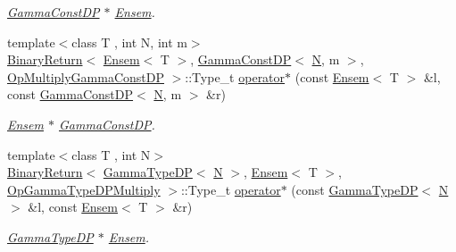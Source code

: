 \begin{DoxyCompactItemize}
\begin{DoxyCompactList}\small\item\em \mbox{\hyperlink{classENSEM_1_1GammaConstDP}{Gamma\+Const\+DP}} $\ast$ \mbox{\hyperlink{classENSEM_1_1Ensem}{Ensem}}. \end{DoxyCompactList}\item 
{\footnotesize template$<$class T , int N, int m$>$ }\\\mbox{\hyperlink{structENSEM_1_1BinaryReturn}{Binary\+Return}}$<$ \mbox{\hyperlink{classENSEM_1_1Ensem}{Ensem}}$<$ T $>$, \mbox{\hyperlink{classENSEM_1_1GammaConstDP}{Gamma\+Const\+DP}}$<$ \mbox{\hyperlink{operator__name__util_8cc_a7722c8ecbb62d99aee7ce68b1752f337}{N}}, m $>$, \mbox{\hyperlink{structENSEM_1_1OpMultiplyGammaConstDP}{Op\+Multiply\+Gamma\+Const\+DP}} $>$\+::Type\+\_\+t \mbox{\hyperlink{group__eensem_ga0377e46872c4fb569a240b0b60ef577e}{operator$\ast$}} (const \mbox{\hyperlink{classENSEM_1_1Ensem}{Ensem}}$<$ T $>$ \&l, const \mbox{\hyperlink{classENSEM_1_1GammaConstDP}{Gamma\+Const\+DP}}$<$ \mbox{\hyperlink{operator__name__util_8cc_a7722c8ecbb62d99aee7ce68b1752f337}{N}}, m $>$ \&r)
\begin{DoxyCompactList}\small\item\em \mbox{\hyperlink{classENSEM_1_1Ensem}{Ensem}} $\ast$ \mbox{\hyperlink{classENSEM_1_1GammaConstDP}{Gamma\+Const\+DP}}. \end{DoxyCompactList}\item 
{\footnotesize template$<$class T , int N$>$ }\\\mbox{\hyperlink{structENSEM_1_1BinaryReturn}{Binary\+Return}}$<$ \mbox{\hyperlink{classENSEM_1_1GammaTypeDP}{Gamma\+Type\+DP}}$<$ \mbox{\hyperlink{operator__name__util_8cc_a7722c8ecbb62d99aee7ce68b1752f337}{N}} $>$, \mbox{\hyperlink{classENSEM_1_1Ensem}{Ensem}}$<$ T $>$, \mbox{\hyperlink{structENSEM_1_1OpGammaTypeDPMultiply}{Op\+Gamma\+Type\+D\+P\+Multiply}} $>$\+::Type\+\_\+t \mbox{\hyperlink{group__eensem_ga53d61b0a5109e4f59f7b77a3fb4817f9}{operator$\ast$}} (const \mbox{\hyperlink{classENSEM_1_1GammaTypeDP}{Gamma\+Type\+DP}}$<$ \mbox{\hyperlink{operator__name__util_8cc_a7722c8ecbb62d99aee7ce68b1752f337}{N}} $>$ \&l, const \mbox{\hyperlink{classENSEM_1_1Ensem}{Ensem}}$<$ T $>$ \&r)
\begin{DoxyCompactList}\small\item\em \mbox{\hyperlink{classENSEM_1_1GammaTypeDP}{Gamma\+Type\+DP}} $\ast$ \mbox{\hyperlink{classENSEM_1_1Ensem}{Ensem}}. \end{DoxyCompactList}\item 

\end{DoxyCompactItemize}
